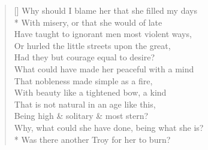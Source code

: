 \documentclass[MAIN]{subfiles}
\begin{document}
\settowidth{\versewidth}{\vin What could have made her peaceful with a mind}
\begin{verse}[\versewidth]
Why should I blame her that she filled my days\\* 
\vin With misery, or that she would of late\\
Have taught to ignorant men most violent ways,\\
\vin Or hurled the little streets upon the great,\\
Had they but courage equal to desire?\\
\vin What could have made her peaceful with a mind\\
That nobleness made simple as a fire,\\
\vin With beauty like a tightened bow, a kind\\
That is not natural in an age like this,\\
\vin Being high \& solitary \& most stern?\\
Why, what could she have done, being what she is?\\*
\vin Was there another {\sc Troy} for her to burn?
\end{verse}
\end{document}
